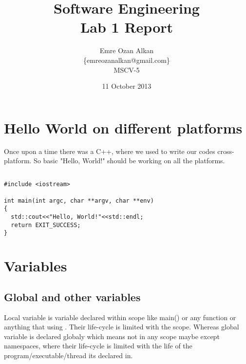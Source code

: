 \documentclass{article}
\title{Software Engineering\\
		Lab 1 Report}
\author{Emre Ozan Alkan\\
		\{emreozanalkan@gmail.com\}\\
		MSCV-5}
\date{11 October 2013}
\begin{document}
\maketitle

\section{Hello World on different platforms}

Once upon a time there was a C++, where we used to write our codes cross-platform. So basic "Hello, World!"  should be working on all the platforms.

\begin{lstlisting}[label=hello-world,caption=Hello World!]
	
#include <iostream>

int main(int argc, char **argv, char **env)
{
  std::cout<<"Hello, World!"<<std::endl;  
  return EXIT_SUCCESS;
}
\end{lstlisting}


\section{Variables}
	
	\subsection{Global and other variables}
		Local variable is variable declared within scope like main() or any function or anything that using { }. Their life-cycle is limited with the scope. Whereas global variable is declared globaly which means not in any scope maybe except namespaces, where their life-cycle is limited with the life of the program/executable/thread its declared in. 
\end{document}
